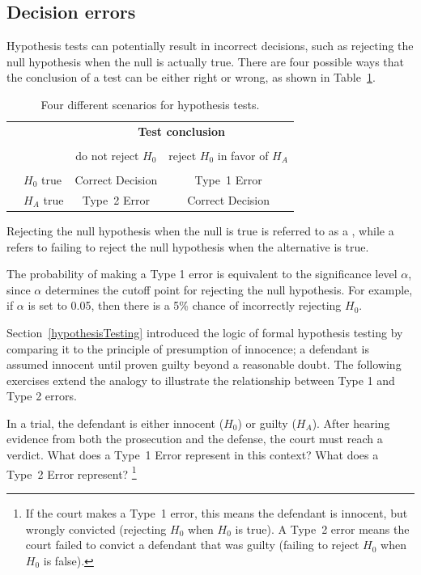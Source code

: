 \begin{spacing}{1.5}
\subsection{Decision errors}

Hypothesis tests can potentially result in incorrect decisions, such as rejecting the null hypothesis when the null is actually true. There are four possible ways that the conclusion of a test can be either right or wrong, as shown in Table~\ref{fourHTScenarios}. 

\begin{table}[ht]
	\centering
	\begin{tabular}{l l c c}
		& & \multicolumn{2}{c}{\textbf{Test conclusion}} \\
		\cline{3-4}
		\vspace{-3.7mm} \\
		& & do not reject $H_0$ &  reject $H_0$ in favor of $H_A$ \\
		\cline{2-4}
		\vspace{-3.7mm} \\
		& $H_0$ true & Correct Decision &  Type~1 Error \\
		\raisebox{1.5ex}{\textbf{Truth}} & $H_A$ true & Type~2 Error & Correct Decision\\
		\cline{2-4}
	\end{tabular}
	\caption{Four different scenarios for hypothesis tests.}
	\label{fourHTScenarios}
\end{table}

Rejecting the null hypothesis when the null is true is referred to as a , while a  refers to failing to reject the null hypothesis when the alternative is true. 

The probability of making a Type 1 error is equivalent to the significance level $\alpha$, since $\alpha$ determines the cutoff point for rejecting the null hypothesis. For example, if $\alpha$ is set to 0.05, then there is a 5\% chance of incorrectly rejecting $H_0$. 

Section~\ref{hypothesisTesting} introduced the logic of formal hypothesis testing by comparing it to the principle of presumption of innocence; a defendant is assumed innocent until proven guilty beyond a reasonable doubt. The following exercises extend the analogy to illustrate the relationship between Type 1 and Type 2 errors.

\begin{exercise} \label{whatAreTheErrorTypesInUSCourts}
	In a trial, the defendant is either innocent ($H_0$) or guilty ($H_A$). After hearing evidence from both the prosecution and the defense, the court must reach a verdict. What does a Type~1 Error represent in this context? What does a Type~2 Error represent? \footnote{If the court makes a Type~1 error, this means the defendant is innocent, but wrongly convicted (rejecting $H_0$ when $H_0$ is true). A Type~2 error means the court failed to convict a defendant that was guilty (failing to reject $H_0$ when $H_0$ is false).}
\end{exercise}


\end{spacing}
